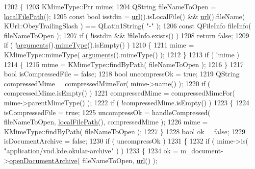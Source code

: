 \begin{DoxyCode}
1202 \{
1203     KMimeType::Ptr mime;
1204     QString fileNameToOpen = \hyperlink{classKParts_1_1ReadOnlyPart_a9c411f8471de1a852c8595719d179946}{localFilePath}();
1205     \textcolor{keyword}{const} \textcolor{keywordtype}{bool} isstdin = \hyperlink{classKParts_1_1ReadOnlyPart_aba05c3b2fd42dcfebc6585e4f746d2cb}{url}().isLocalFile() && \hyperlink{classKParts_1_1ReadOnlyPart_aba05c3b2fd42dcfebc6585e4f746d2cb}{url}().fileName( KUrl::ObeyTrailingSlash ) == 
      QLatin1String( \textcolor{stringliteral}{"-"} );
1206     \textcolor{keyword}{const} QFileInfo fileInfo( fileNameToOpen );
1207     \textcolor{keywordflow}{if} ( !isstdin && !fileInfo.exists() )
1208         \textcolor{keywordflow}{return} \textcolor{keyword}{false};
1209     \textcolor{keywordflow}{if} ( !\hyperlink{classKParts_1_1ReadOnlyPart_a811e25200521dcf347bacb6be7ab8ecf}{arguments}().\hyperlink{classKParts_1_1OpenUrlArguments_aaddc679e216a0ce1a20983c0134675c5}{mimeType}().isEmpty() )
1210     \{
1211         mime = KMimeType::mimeType( \hyperlink{classKParts_1_1ReadOnlyPart_a811e25200521dcf347bacb6be7ab8ecf}{arguments}().mimeType() );
1212     \}
1213     \textcolor{keywordflow}{if} ( !mime )
1214     \{
1215         mime = KMimeType::findByPath( fileNameToOpen );
1216     \}
1217     \textcolor{keywordtype}{bool} isCompressedFile = \textcolor{keyword}{false};
1218     \textcolor{keywordtype}{bool} uncompressOk = \textcolor{keyword}{true};
1219     QString compressedMime = compressedMimeFor( mime->name() );
1220     \textcolor{keywordflow}{if} ( compressedMime.isEmpty() )
1221         compressedMime = compressedMimeFor( mime->parentMimeType() );
1222     \textcolor{keywordflow}{if} ( !compressedMime.isEmpty() )
1223     \{
1224         isCompressedFile = \textcolor{keyword}{true};
1225         uncompressOk = handleCompressed( fileNameToOpen, \hyperlink{classKParts_1_1ReadOnlyPart_a9c411f8471de1a852c8595719d179946}{localFilePath}(), compressedMime );
1226         mime = KMimeType::findByPath( fileNameToOpen );
1227     \}
1228     \textcolor{keywordtype}{bool} ok = \textcolor{keyword}{false};
1229     isDocumentArchive = \textcolor{keyword}{false};
1230     \textcolor{keywordflow}{if} ( uncompressOk )
1231     \{
1232         \textcolor{keywordflow}{if} ( mime->is( \textcolor{stringliteral}{"application/vnd.kde.okular-archive"} ) )
1233         \{
1234             ok = m\_document->\hyperlink{classOkular_1_1Document_a203b2307aa0d4baf08628cf70e21a3b4}{openDocumentArchive}( fileNameToOpen, 
      \hyperlink{classKParts_1_1ReadOnlyPart_aba05c3b2fd42dcfebc6585e4f746d2cb}{url}() );

\end{DoxyCode}
